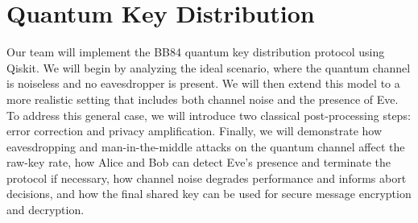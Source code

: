 \documentclass[10pt]{article}
\begin{document}
\section*{Quantum Key Distribution}
Our team will implement the BB84 quantum key distribution protocol using Qiskit. We will begin by analyzing the ideal scenario, where the quantum channel is noiseless and no eavesdropper is present. We will then extend this model to a more realistic setting that includes both channel noise and the presence of Eve. To address this general case, we will introduce two classical post-processing steps: error correction and privacy amplification. Finally, we will demonstrate how eavesdropping and man-in-the-middle attacks on the quantum channel affect the raw-key rate, how Alice and Bob can detect Eve’s presence and terminate the protocol if necessary, how channel noise degrades performance and informs abort decisions, and how the final shared key can be used for secure message encryption and decryption. 

\nocite{nielsen2010quantum}
\nocite{bennett2014quantum}
\nocite{PhysRevLett.68.3121}
\nocite{PhysRevLett.67.661}
\nocite{10.1145/3575879.3576022}
\nocite{PhysRevLett.92.057901}
\nocite{10.1145/1008908.1008920}
\nocite{Dixon2008}
\nocite{Curty2010}

\printbibliography
\end{document}
